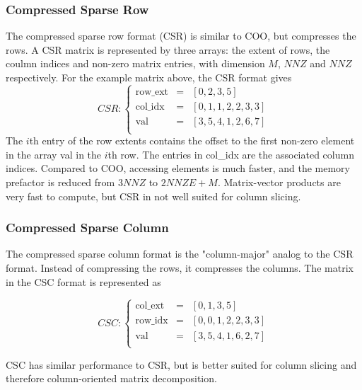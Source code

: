 \subsubsection{Compressed Sparse Row}

The compressed sparse row format (CSR) is similar to COO, but compresses the rows. A CSR matrix is represented by three arrays: the extent of rows, the coulmn indices and non-zero matrix entries, with dimension $M$, $NNZ$ and $NNZ$ respectively. For the example matrix above, the CSR format gives
\begin{equation*}
CSR: \left\lbrace
\begin{array}{lll}
\textrm{row\_ext} &= &\left[ 0, 2, 3, 5 \right] \\
\textrm{col\_idx} &= &\left[ 0, 1, 1, 2, 2, 3, 3 \right] \\
\textrm{val}  &= &\left[ 3, 5, 4, 1, 2, 6, 7 \right] \\
\end{array}
\right.
\end{equation*}
\noindent The $i$th entry of the row extents contains the offset to the first non-zero element in the array \textrm{val} in the $i$th row. The entries in \textrm{col\_idx} are the associated column indices. Compared to COO, accessing elements is much faster, and the memory prefactor is reduced from $3NNZ$ to $2NNZE+M$. Matrix-vector products are very fast to compute, but CSR in not well suited for column slicing.

\subsubsection{Compressed Sparse Column}

The compressed sparse column format is the "column-major" analog to the CSR format. Instead of compressing the rows, it compresses the columns. The matrix in the CSC format is represented as

\begin{equation*}
CSC: \left\lbrace
\begin{array}{lll}
\textrm{col\_ext} &= &\left[ 0, 1, 3, 5 \right] \\
\textrm{row\_idx} &= &\left[ 0, 0, 1, 2, 2, 3, 3 \right] \\
\textrm{val}  &= &\left[ 3, 5, 4, 1, 6, 2, 7 \right] \\
\end{array}
\right.
\end{equation*}

CSC has similar performance to CSR, but is better suited for column slicing and therefore column-oriented matrix decomposition.

